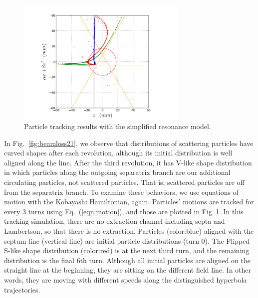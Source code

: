 \documentclass[aps,prstab,onecolumn,preprint,endfloats,11pt]{revtex4-1}
\begin{document}
\begin{figure}[!tbp]
  \includegraphics[width=3.2in]{img/fig_beamloss3}
  \caption{\label{fig:beamloss3} Particle tracking results with the simplified resonance model.}
\end{figure}

In Fig.~\ref{fig:beamloss21}, we observe that distributions of scattering particles have curved shapes after each revolution, although its initial distribution is well aligned along the line. After the third revolution, it has V-like shape distribution in which particles along the outgoing separatrix branch are our additional circulating particles, not scattered particles. That is, scattered particles are off from the separatrix branch. To examine these behaviors, we use equations of motion with the Kobayashi Hamiltonian, again. Particles' motions are tracked for every 3 turns using Eq.~(\ref{eqn:motion}), and those are plotted in Fig~\ref{fig:beamloss3}. In this tracking simulation, there are no extraction channel including septa and Lambertson, so that there is no extraction. Particles (color:blue) aligned with the septum line (vertical line) are initial particle distributions (turn 0). The Flipped S-like shape distribution (color:red) is at the next third turn, and the remaining distribution is the final 6th turn. Although all initial particles are aligned on the straight line at the beginning, they are sitting on the different field line. In other words, they are moving with different speeds along the distinguished hyperbola trajectories. 



% 
% 
\end{document}
